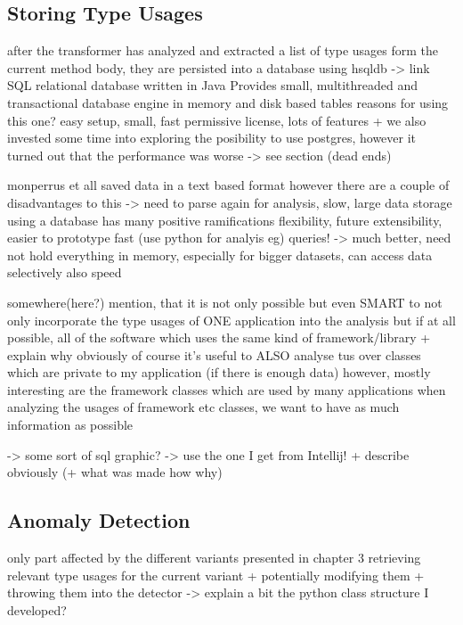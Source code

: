 \subsection{Storing Type Usages}

after the transformer has analyzed and extracted a list of type usages form the current method body, they are persisted into a database
using hsqldb -> link
SQL relational database written in Java
Provides small, multithreaded and transactional database engine
in memory and disk based tables 
reasons for using this one?
easy setup, small, fast
permissive license, lots of features
+ we also invested some time into exploring the posibility to use postgres, however it turned out that the performance was worse -> see section (dead ends)

monperrus et all saved data in a text based format
however there are a couple of disadvantages to this
-> need to parse again for analysis, slow, large data storage
using a database has many positive ramifications
flexibility, future extensibility, easier to prototype fast (use python for analyis eg)
queries! -> much better, need not hold everything in memory, especially for bigger datasets, can access data selectively
also speed

somewhere(here?) mention, that it is not only possible but even SMART to not only incorporate the type usages of ONE application into the analysis but if at all possible, all of the software which uses the same kind of framework/library
+ explain why obviously
    of course it's useful to ALSO analyse tus over classes which are private to my application (if there is enough data)
    however, mostly interesting are the framework classes which are used by many applications
    when analyzing the usages of framework etc classes, we want to have as much information as possible

-> some sort of sql graphic? -> use the one I get from Intellij!
+ describe obviously (+ what was made how why)

\subsection{Anomaly Detection}
only part affected by the different variants presented in chapter 3
retrieving relevant type usages for the current variant + potentially modifying them + throwing them into the detector
-> explain a bit the python class structure I developed?

